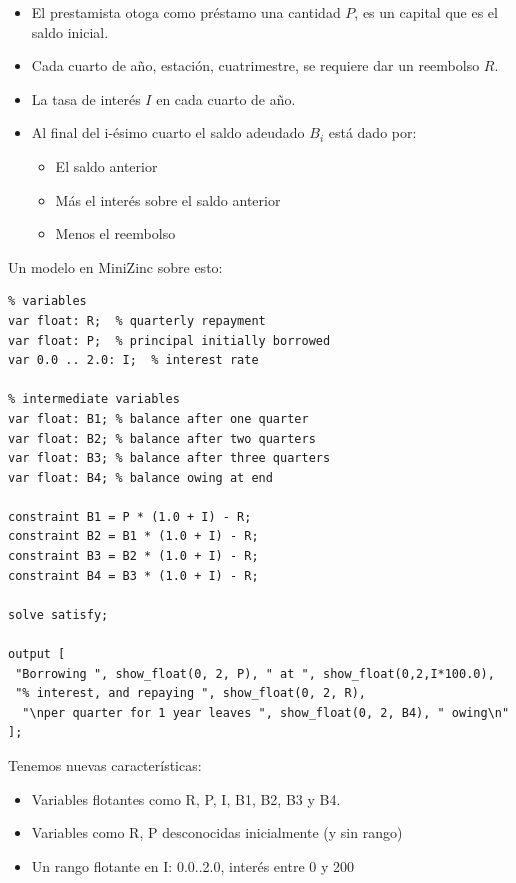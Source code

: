 \documentclass[12pt]{article}
\begin{document}
\begin{itemize}
\item El prestamista otoga como préstamo una cantidad $P$, es un capital que es el saldo inicial.
\item Cada cuarto de año, estación, cuatrimestre, se requiere dar un reembolso $R$.
\item La tasa de interés $I$ en cada cuarto de año.
\item Al final del i-ésimo cuarto el saldo adeudado $B_{i}$ está dado por:
\begin{itemize}
\item El saldo anterior
\item Más el interés sobre el saldo anterior
\item Menos el reembolso
\end{itemize}
\end{itemize}

\begin{justify}
Un modelo en MiniZinc sobre esto:
\end{justify}

\begin{Verbatim}
% variables
var float: R;  % quarterly repayment
var float: P;  % principal initially borrowed
var 0.0 .. 2.0: I;  % interest rate

% intermediate variables
var float: B1; % balance after one quarter
var float: B2; % balance after two quarters
var float: B3; % balance after three quarters
var float: B4; % balance owing at end

constraint B1 = P * (1.0 + I) - R;
constraint B2 = B1 * (1.0 + I) - R;
constraint B3 = B2 * (1.0 + I) - R; 
constraint B4 = B3 * (1.0 + I) - R;

solve satisfy;

output [
 "Borrowing ", show_float(0, 2, P), " at ", show_float(0,2,I*100.0), 
 "% interest, and repaying ", show_float(0, 2, R), 
  "\nper quarter for 1 year leaves ", show_float(0, 2, B4), " owing\n"
];
\end{Verbatim}

\begin{justify}
Tenemos nuevas características:
\end{justify}

\begin{itemize}
\item Variables flotantes como R, P, I, B1, B2, B3 y B4.
\item Variables como R, P desconocidas inicialmente (y sin rango)
\item Un rango flotante en I: 0.0..2.0, interés entre 0 y 200%
\end{itemize}
\end{document}
